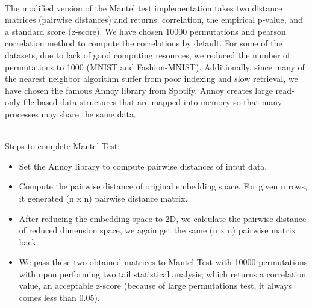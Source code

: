 \documentclass[letterpaper, 10 pt, conference]{ieeeconf}  %
\begin{document}
\\The modified version of the Mantel test implementation takes two distance matrices (pairwise distances) and returns: correlation, the empirical p-value, and a standard score (z-score). We have chosen 10000 permutations and pearson correlation method to compute the correlations by default. For some of the datasets, due to lack of good computing resources, we reduced the number of permutations to 1000 (MNIST and Fashion-MNIST). Additionally, since many of the nearest neighbor algorithm suffer from poor indexing and slow retrieval, we have chosen the famous Annoy library from Spotify. Annoy creates large read-only file-based data structures that are mapped into memory so that many processes may share the same data.

\\Steps to complete Mantel Test:
\begin{itemize}
	\item Set the Annoy library to compute pairwise distances of input data.
	\item Compute the pairwise distance of original embedding space. For given n rows, it generated (n x n)
pairwise distance matrix.
	\item After reducing the embedding space to 2D, we calculate the pairwise distance of reduced dimension
space, we again get the same (n x n) pairwise matrix back.
    \item We pass these two obtained matrices to Mantel Test with 10000 permutations with upon performing
two tail statistical analysis; which returns a correlation value, an acceptable z-score (because of large permutations test, it always comes less than 0.05).
\end{itemize}
\end{document}
